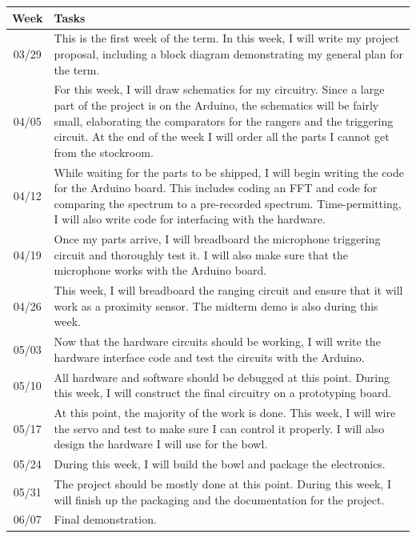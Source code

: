 \documentclass[10pt]{article}
\begin{document}
\setlength\extrarowheight{5pt}
\begin{tabularx}{\textwidth}{c X}
    Week & Tasks \\
    \midrule
    03/29 & This is the first week of the term. In this week, I will write my
    project proposal, including a block diagram demonstrating my general plan
    for the term. \\
    04/05 & For this week, I will draw schematics for my circuitry. Since a
    large part of the project is on the Arduino, the schematics will be fairly
    small, elaborating the comparators for the rangers and the triggering
    circuit. At the end of the week I will order all the parts I cannot get from
    the stockroom. \\
    04/12 & While waiting for the parts to be shipped, I will begin writing the
    code for the Arduino board. This includes coding an FFT and code for
    comparing the spectrum to a pre-recorded spectrum. Time-permitting, I will
    also write code for interfacing with the hardware. \\
    04/19 & Once my parts arrive, I will breadboard the microphone triggering
    circuit and thoroughly test it. I will also make sure that the microphone
    works with the Arduino board. \\
    04/26 & This week, I will breadboard the ranging circuit and ensure that it
    will work as a proximity sensor. The midterm demo is also during this week. \\
    05/03 & Now that the hardware circuits should be working, I will write the
    hardware interface code and test the circuits with the Arduino. \\
    05/10 & All hardware and software should be debugged at this point. During
    this week, I will construct the final circuitry on a prototyping board. \\
    05/17 & At this point, the majority of the work is done. This week, I will
    wire the servo and test to make sure I can control it properly. I will also
    design the hardware I will use for the bowl. \\
    05/24 & During this week, I will build the bowl and package the electronics. \\
    05/31 & The project should be mostly done at this point. During this week, I
    will finish up the packaging and the documentation for the project. \\
    06/07 & Final demonstration.
\end{tabularx}
\end{document}
